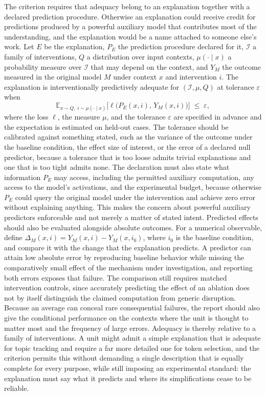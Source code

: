 \documentclass[11pt]{article}
\begin{document}
The criterion requires that adequacy belong to an explanation together with a declared prediction procedure. Otherwise an explanation could receive credit for predictions produced by a powerful auxiliary model that contributes most of the understanding, and the explanation would be a name attached to someone else's work. Let $E$ be the explanation, $P_E$ the prediction procedure declared for it, $\mathcal I$ a family of interventions, $Q$ a distribution over input contexts, $\mu(\cdot\mid x)$ a probability measure over $\mathcal I$ that may depend on the context, and $Y_M$ the outcome measured in the original model $M$ under context $x$ and intervention $i$. The explanation is interventionally predictively adequate for $(\mathcal I, \mu, Q)$ at tolerance $\varepsilon$ when
\begin{equation}
\mathbb{E}_{x\sim Q,\; i\sim\mu(\cdot\mid x)}\Big[\ell\big(P_E(x,i),\,Y_M(x,i)\big)\Big]\;\le\;\varepsilon ,
\end{equation}
where the loss $\ell$, the measure $\mu$, and the tolerance $\varepsilon$ are specified in advance and the expectation is estimated on held-out cases. The tolerance should be calibrated against something stated, such as the variance of the outcome under the baseline condition, the effect size of interest, or the error of a declared null predictor, because a tolerance that is too loose admits trivial explanations and one that is too tight admits none. The declaration must also state what information $P_E$ may access, including the permitted auxiliary computation, any access to the model's activations, and the experimental budget, because otherwise $P_E$ could query the original model under the intervention and achieve zero error without explaining anything. This makes the concern about powerful auxiliary predictors enforceable and not merely a matter of stated intent. Predicted effects should also be evaluated alongside absolute outcomes. For a numerical observable, define $\Delta_M(x,i)=Y_M(x,i)-Y_M(x,i_0)$, where $i_0$ is the baseline condition, and compare it with the change that the explanation predicts. A predictor can attain low absolute error by reproducing baseline behavior while missing the comparatively small effect of the mechanism under investigation, and reporting both errors exposes that failure. The comparison still requires matched intervention controls, since accurately predicting the effect of an ablation does not by itself distinguish the claimed computation from generic disruption. Because an average can conceal rare consequential failures, the report should also give the conditional performance on the contexts where the unit is thought to matter most and the frequency of large errors. Adequacy is thereby relative to a family of interventions. A unit might admit a simple explanation that is adequate for topic tracking and require a far more detailed one for token selection, and the criterion permits this without demanding a single description that is equally complete for every purpose, while still imposing an experimental standard: the explanation must say what it predicts and where its simplifications cease to be reliable.
\end{document}
